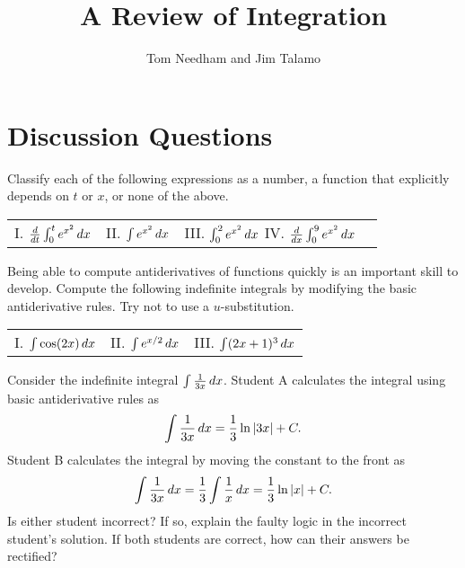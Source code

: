 \documentclass[handout,hints]{ximera}
\author{Tom Needham and Jim Talamo}
\title[]{A Review of Integration}
\begin{document}
\begin{abstract}
\end{abstract}
\maketitle

\vspace{-0.9in}

\section{Discussion Questions}

\begin{problem}
Classify each of the following expressions as a number, a function that explicitly depends on $t$ or $x$, or none of the above.



\begin{tabular}{llll}
I. $\frac{\mathop{}\!d}{\mathop{}\!d t} \int_0^t e^{x^2} \mathop{}\!d x$ \hspace{0.2in} & II. $\int e^{x^2} \mathop{}\!d x$ \hspace{0.2in} & III. $\int_0^2 e^{x^2} \mathop{}\!d x$ \hspace{0.2in}
IV. $\frac{d}{dx} \int_0^9 e^{x^2} \mathop{}\!d x$
\end{tabular}

\end{problem}

\begin{problem}
Being able to compute antiderivatives of functions quickly is an important skill to develop.  Compute the following indefinite integrals by modifying the basic antiderivative rules.  Try not to use a $u$-substitution.

\begin{center}
\begin{tabular}{lll} 
I. $\int \cos(2x) \mathop{}\!d x$ \hspace{.7in} & II. $\int e^{x/2} \mathop{}\!d x$ \hspace{.7in} & III. $\int (2x+1)^3 \mathop{}\!d x$
\end{tabular}
\end{center}

\end{problem}

\begin{problem}
Consider the indefinite integral $\int \frac{1}{3x} \mathop{}\!d x$. Student A calculates the integral using basic antiderivative rules as
$$
\int \frac{1}{3x} \mathop{}\!d x = \frac{1}{3} \ln |3x| + C.
$$
Student B calculates the integral by moving the constant to the front as 
$$
\int \frac{1}{3x} \mathop{}\!d x = \frac{1}{3} \int \frac{1}{x} \mathop{}\!d x = \frac{1}{3} \ln |x| + C.
$$
Is either student incorrect?  If so, explain the faulty logic in the incorrect student's solution.  If both students are correct, how can their answers be rectified?

\end{problem}
\end{document}
